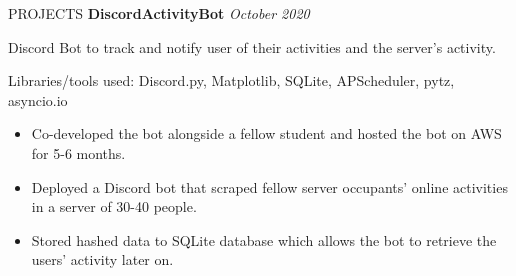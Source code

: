 \documentclass{ResumeFormat} %
\begin{document}
\begin{rSection}{PROJECTS}
\textbf{DiscordActivityBot} {} \hfill {\emph{October 2020}}

Discord Bot to track and notify user of their activities and the server’s activity.

Libraries/tools used: Discord.py, Matplotlib, SQLite, APScheduler, pytz, asyncio.io
\begin{itemize}
    \itemsep -3pt {}
     \item Co-developed the bot alongside a fellow student and hosted the bot on AWS for 5-6 months.
     \item Deployed a Discord bot that scraped fellow server occupants’ online activities in a server of 30-40 people.
     \item Stored hashed data to SQLite database which allows the bot to retrieve the users' activity later on.
 \end{itemize}
\end{rSection} 





 
\end{document}
